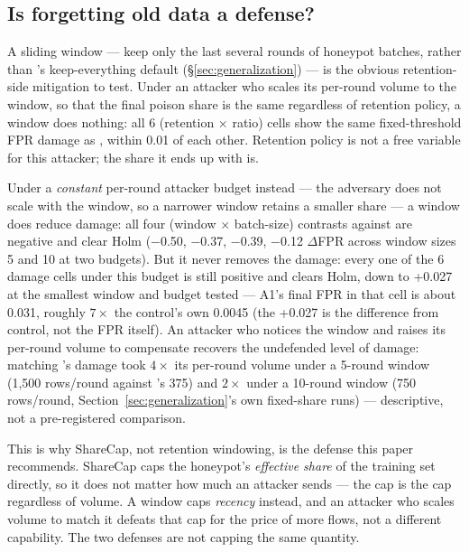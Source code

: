 \subsection{Is forgetting old data a defense?}
\label{sec:retention-defense}
A sliding window — keep only the last several rounds of honeypot batches, rather than
's keep-everything default (\S\ref{sec:generalization}) — is the obvious
retention-side mitigation to test. Under an attacker who scales its per-round volume to the
window, so that the final poison share is the same regardless of retention policy, a window does
nothing: all 6 (retention $\times$ ratio) cells show the same fixed-threshold FPR damage as
, within 0.01 of each other. Retention policy is not a free variable for this
attacker; the share it ends up with is.

Under a \emph{constant} per-round attacker budget instead — the adversary does not scale with the
window, so a narrower window retains a smaller share — a window does reduce damage: all four
(window $\times$ batch-size) contrasts against  are negative and clear Holm
(−0.50, −0.37, −0.39, −0.12 $\Delta$FPR across window sizes 5 and 10 at two budgets). But it never
removes the damage: every one of the 6 damage cells under this budget is still positive and
clears Holm, down to +0.027 at the smallest window and budget tested — A1's final FPR in that
cell is about 0.031, roughly $7\times$ the control's own 0.0045 (the +0.027 is the difference
from control, not the FPR itself). An attacker who notices the window and raises its per-round
volume to compensate recovers the undefended level of damage: matching 's
damage took $4\times$ its per-round volume under a 5-round window (1,500 rows/round against
's 375) and $2\times$ under a 10-round window (750 rows/round,
Section~\ref{sec:generalization}'s own fixed-share runs) — descriptive, not a pre-registered
comparison.

This is why ShareCap, not retention windowing, is the defense this paper recommends. ShareCap
caps the honeypot's \emph{effective share} of the training set directly, so it does not matter how
much an attacker sends — the cap is the cap regardless of volume. A window caps \emph{recency}
instead, and an attacker who scales volume to match it defeats that cap for the price of more
flows, not a different capability. The two defenses are not capping the same quantity.

